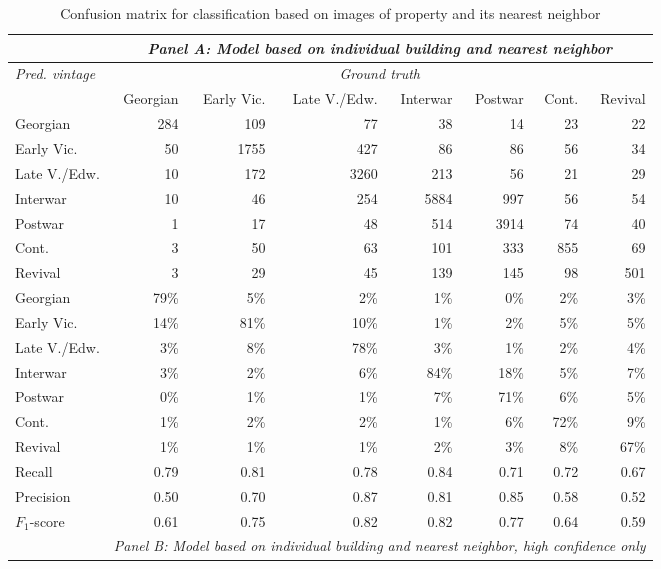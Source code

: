 \begin{table}[!htb]
	\caption{Confusion matrix for classification based on images of property and its nearest neighbor}
	\label{tab:confmat}
	\centering
\begingroup\footnotesize
	\emph{}
\begin{tabular}{lrrrrrrr}
	& \multicolumn{7}{c}{\rule{0pt}{4ex}    \emph{Panel A: Model based on individual building and nearest neighbor} \rule{0pt}{4ex}    }\\
	\toprule
	\emph{Pred. vintage} & \multicolumn{7}{c}{\emph{Ground truth}} \\
	\cmidrule(lr){2-8}
	& Georgian & Early Vic. & Late V./Edw. & Interwar & Postwar & Cont. & Revival \\
  \cmidrule(lr){1-1}
\cmidrule(lr){2-8}
	Georgian & 284 & 109 & 77 & 38 & 14 & 23 & 22 \\
	  Early Vic. & 50 & 1755 & 427 & 86 & 86 & 56 & 34 \\
	  Late V./Edw. & 10 & 172 & 3260 & 213 & 56 & 21 & 29 \\
	  Interwar & 10 & 46 & 254 & 5884 & 997 & 56 & 54 \\
	  Postwar & 1 & 17 & 48 & 514 & 3914 & 74 & 40 \\
	  Cont. & 3 & 50 & 63 & 101 & 333 & 855 & 69 \\
	  Revival & 3 & 29 & 45 & 139 & 145 & 98 & 501 \\
		\cmidrule(lr){1-1}
\cmidrule(lr){2-8}
	  Georgian & 79\% & 5\% & 2\% & 1\% & 0\% & 2\% & 3\% \\
	  Early Vic. & 14\% & 81\% & 10\% & 1\% & 2\% & 5\% & 5\% \\
	  Late V./Edw. & 3\% & 8\% & 78\% & 3\% & 1\% & 2\% & 4\% \\
	  Interwar & 3\% & 2\% & 6\% & 84\% & 18\% & 5\% & 7\% \\
	  Postwar & 0\% & 1\% & 1\% & 7\% & 71\% & 6\% & 5\% \\
	  Cont. & 1\% & 2\% & 2\% & 1\% & 6\% & 72\% & 9\% \\
	  Revival & 1\% & 1\% & 1\% & 2\% & 3\% & 8\% & 67\% \\
		\cmidrule(lr){1-1}
\cmidrule(lr){2-8}
	  Recall & 0.79 & 0.81 & 0.78 & 0.84 & 0.71 & 0.72 & 0.67 \\
	  Precision & 0.50 & 0.70 & 0.87 & 0.81 & 0.85 & 0.58 & 0.52 \\
	  $F_1$-score & 0.61 & 0.75 & 0.82 & 0.82 & 0.77 & 0.64 & 0.59 \\

		\cmidrule(lr){1-1} \cmidrule(lr){2-8}
		& \multicolumn{7}{c}{ \emph{ Panel B: Model based on individual building and nearest neighbor, high confidence only} \rule{0pt}{4ex}    }\\
		\cmidrule(lr){1-1} \cmidrule(lr){2-8}


\end{tabular}
\end{table}
